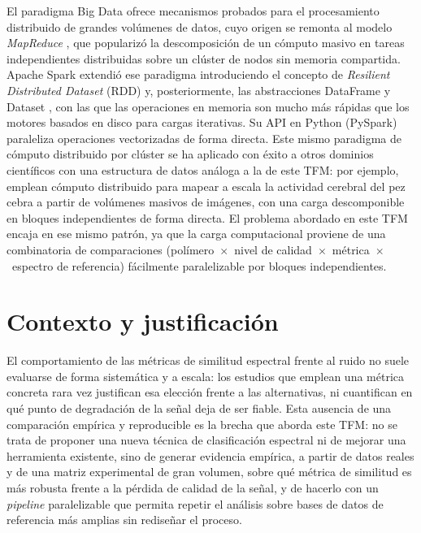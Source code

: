 El paradigma Big Data ofrece mecanismos probados para el procesamiento distribuido de grandes volúmenes de datos, cuyo origen se remonta al modelo \textit{MapReduce} \citep{dean2004mapreduce}, que popularizó la descomposición de un cómputo masivo en tareas independientes distribuidas sobre un clúster de nodos sin memoria compartida. Apache Spark \citep{zaharia2010spark, zaharia2016spark} extendió ese paradigma introduciendo el concepto de \textit{Resilient Distributed Dataset} (RDD) y, posteriormente, las abstracciones DataFrame y Dataset \citep{armbrust2015sparksql}, con las que las operaciones en memoria son mucho más rápidas que los motores basados en disco para cargas iterativas. Su API en Python (PySpark) paraleliza operaciones vectorizadas de forma directa. Este mismo paradigma de cómputo distribuido por clúster se ha aplicado con éxito a otros dominios científicos con una estructura de datos análoga a la de este TFM: por ejemplo, \citet{freeman2014mapping} emplean cómputo distribuido para mapear a escala la actividad cerebral del pez cebra a partir de volúmenes masivos de imágenes, con una carga descomponible en bloques independientes de forma directa. El problema abordado en este TFM encaja en ese mismo patrón, ya que la carga computacional proviene de una combinatoria de comparaciones (polímero~$\times$~nivel de calidad~$\times$~métrica~$\times$~espectro de referencia) fácilmente paralelizable por bloques independientes.

\section{Contexto y justificación}

El comportamiento de las métricas de similitud espectral frente al ruido no suele evaluarse de forma sistemática y a escala: los estudios que emplean una métrica concreta rara vez justifican esa elección frente a las alternativas, ni cuantifican en qué punto de degradación de la señal deja de ser fiable. Esta ausencia de una comparación empírica y reproducible es la brecha que aborda este TFM: no se trata de proponer una nueva técnica de clasificación espectral ni de mejorar una herramienta existente, sino de generar evidencia empírica, a partir de datos reales y de una matriz experimental de gran volumen, sobre qué métrica de similitud es más robusta frente a la pérdida de calidad de la señal, y de hacerlo con un \textit{pipeline} paralelizable que permita repetir el análisis sobre bases de datos de referencia más amplias sin rediseñar el proceso.

